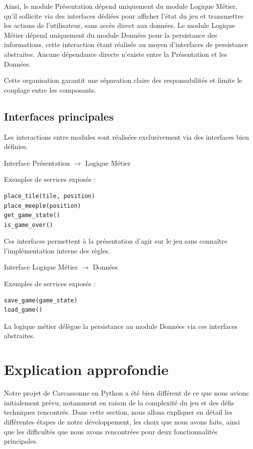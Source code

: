 \documentclass[11pt]{article}
\begin{document}
Ainsi, le module Présentation dépend uniquement du module Logique Métier, qu’il sollicite via des interfaces dédiées pour afficher l’état du jeu et transmettre les actions de l’utilisateur, sans accès direct aux données.
Le module Logique Métier dépend uniquement du module Données pour la persistance des informations, cette interaction étant réalisée au moyen d’interfaces de persistance abstraites.
Aucune dépendance directe n’existe entre la Présentation et les Données.

Cette organisation garantit une séparation claire des responsabilités et limite le couplage entre les composants.

\subsection{Interfaces principales}

Les interactions entre modules sont réalisées exclusivement via des interfaces bien définies.

Interface Présentation $\rightarrow$ Logique Métier

Exemples de services exposés :

{\normalsize
  \begin{verbatim}
place_tile(tile, position)
place_meeple(position)
get_game_state()
is_game_over()
  \end{verbatim}
}



Ces interfaces permettent à la présentation d’agir sur le jeu sans connaître l’implémentation interne des règles.

Interface Logique Métier $\rightarrow$ Données

Exemples de services exposés :

{\normalsize
  \begin{verbatim}
save_game(game_state)
load_game()
  \end{verbatim}
}




La logique métier délègue la persistance au module Données via ces interfaces abstraites.


\section{Explication approfondie}

Notre projet de Carcassonne en Python a été bien différent de ce que nous avions initialement prévu, notamment en raison de la complexité du jeu et des défis techniques rencontrés.
Dans cette section, nous allons expliquer en détail les différentes étapes de notre développement, les choix que nous avons faits, ainsi que les difficultés que nous avons rencontrées pour deux fonctionnalités principales.
\end{document}
